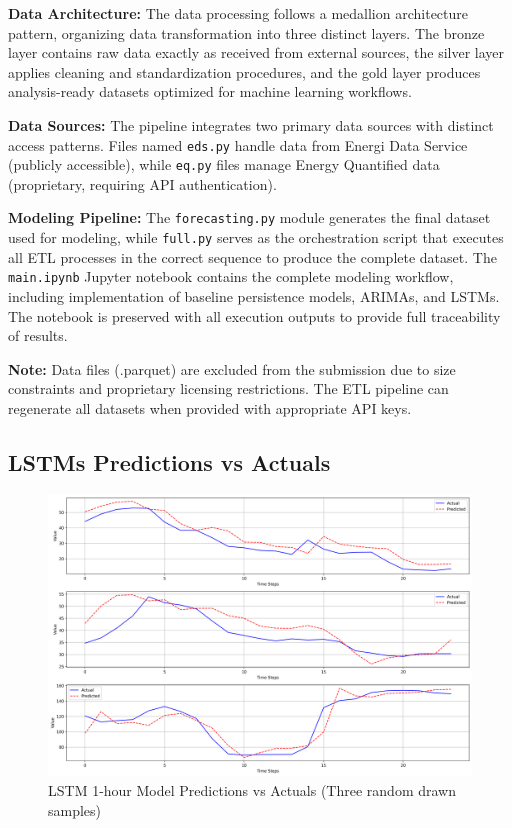 \textbf{Data Architecture:} The data processing follows a medallion architecture pattern, organizing data transformation into three distinct layers. The bronze layer contains raw data exactly as received from external sources, the silver layer applies cleaning and standardization procedures, and the gold layer produces analysis-ready datasets optimized for machine learning workflows.

\textbf{Data Sources:} The pipeline integrates two primary data sources with distinct access patterns. Files named \texttt{eds.py} handle data from Energi Data Service (publicly accessible), while \texttt{eq.py} files manage Energy Quantified data (proprietary, requiring API authentication).

\textbf{Modeling Pipeline:} The \texttt{forecasting.py} module generates the final dataset used for modeling, while \texttt{full.py} serves as the orchestration script that executes all ETL processes in the correct sequence to produce the complete dataset. The \texttt{main.ipynb} Jupyter notebook contains the complete modeling workflow, including implementation of baseline persistence models, ARIMAs, and LSTMs. The notebook is preserved with all execution outputs to provide full traceability of results.

\textbf{Note:} Data files (.parquet) are excluded from the submission due to size constraints and proprietary licensing restrictions. The ETL pipeline can regenerate all datasets when provided with appropriate API keys.

\clearpage

\thispagestyle{plain}
\subsection{LSTMs Predictions vs Actuals}
\label{apdx:lstms-predictions-vs-actuals}

\begin{figure}[ht]
    \centering
    \includegraphics[width=16cm]{sections/figures/lstm_point_test_pred_vs_acts.png}
    \caption{LSTM 1-hour Model Predictions vs Actuals (Three random drawn samples)}
    \label{fig:lstm-point-test-pred-vs-acts}
\end{figure}

